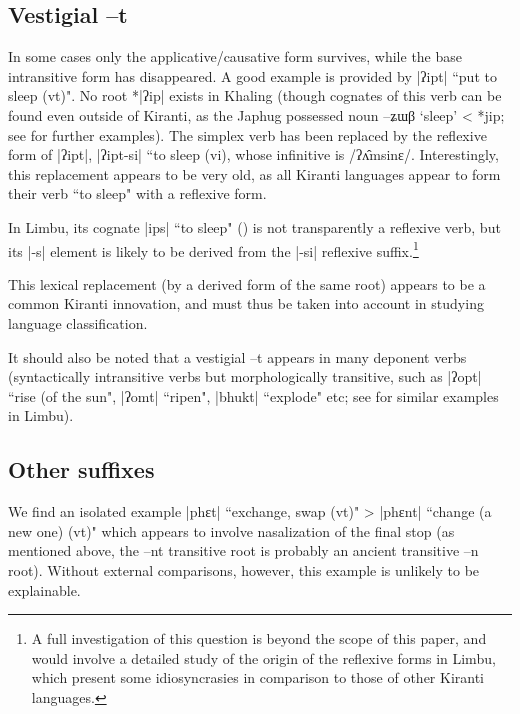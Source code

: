 \documentclass[oldfontcommands,oneside,a4paper,11pt]{article}
\newcommand{\ipa}[1]{{\phon #1}} %
\newcommand{\dhatu}[1]{|\ipa{#1}|}
\begin{document}
\subsection{Vestigial --t}

In some cases only the applicative/causative form survives, while the base intransitive form has disappeared.  A good example is provided by \dhatu{ʔipt} ``put to sleep (vt)". No root *\dhatu{ʔip} exists in Khaling (though cognates of this verb can be found even outside of Kiranti, as the Japhug possessed noun \ipa{--ʑɯβ} `sleep' < *\ipa{jip}; see \citealt{matisoff03} for further examples). The simplex verb has been replaced by the reflexive form of \dhatu{ʔipt}, |ʔipt-si| ``to sleep (vi), whose infinitive is /ʔʌ̂msinɛ/. Interestingly, this replacement appears to be very old, as all Kiranti languages appear to form their verb ``to sleep" with a reflexive form. 

In Limbu, its cognate \dhatu{ips} ``to sleep" (\citealt{michailovsky02dico}) is not transparently a reflexive verb, but its |-s| element is likely to be derived from the |-si| reflexive suffix.\footnote{A full investigation of this question is beyond the scope of this paper, and would involve a detailed study of the origin of the reflexive forms in Limbu, which present some idiosyncrasies in comparison to those of other Kiranti languages.}

This lexical replacement (by a derived form of the same root) appears to be a common Kiranti innovation, and must thus be taken into account in studying language classification.

It should also be noted that a vestigial \ipa{--t} appears in many deponent verbs (syntactically intransitive verbs but morphologically transitive, such as \dhatu{ʔopt} ``rise (of the sun", \dhatu{ʔomt} ``ripen", \dhatu{bhukt} ``explode" etc; see \citealt{michailovsky97deponent} for similar examples in Limbu).



 \subsection{Other suffixes}
We find an isolated example \dhatu{phɛt} ``exchange, swap (vt)" > \dhatu{phɛnt} ``change (a new one) (vt)" which appears to involve nasalization of the final stop (as mentioned above, the \ipa{--nt} transitive root is probably an ancient transitive \ipa{--n} root). Without external comparisons, however, this example is unlikely to be explainable.
\end{document}
